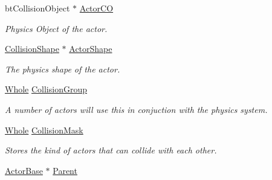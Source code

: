 \begin{DoxyCompactItemize}
\item 
\hypertarget{classphys_1_1ActorBasePhysicsSettings_a259d4d10541b28d389ffa287f07ec916}{
btCollisionObject $\ast$ \hyperlink{classphys_1_1ActorBasePhysicsSettings_a259d4d10541b28d389ffa287f07ec916}{ActorCO}}
\label{classphys_1_1ActorBasePhysicsSettings_a259d4d10541b28d389ffa287f07ec916}

\begin{DoxyCompactList}\small\item\em Physics Object of the actor. \item\end{DoxyCompactList}\item 
\hypertarget{classphys_1_1ActorBasePhysicsSettings_ac95d58db5957ab4f160a8cb5cc6c2f1b}{
\hyperlink{classphys_1_1CollisionShape}{CollisionShape} $\ast$ \hyperlink{classphys_1_1ActorBasePhysicsSettings_ac95d58db5957ab4f160a8cb5cc6c2f1b}{ActorShape}}
\label{classphys_1_1ActorBasePhysicsSettings_ac95d58db5957ab4f160a8cb5cc6c2f1b}

\begin{DoxyCompactList}\small\item\em The physics shape of the actor. \item\end{DoxyCompactList}\item 
\hypertarget{classphys_1_1ActorBasePhysicsSettings_a6a95b9dceba9a60f87b2ae0f3109b638}{
\hyperlink{namespacephys_a460f6bc24c8dd347b05e0366ae34f34a}{Whole} \hyperlink{classphys_1_1ActorBasePhysicsSettings_a6a95b9dceba9a60f87b2ae0f3109b638}{CollisionGroup}}
\label{classphys_1_1ActorBasePhysicsSettings_a6a95b9dceba9a60f87b2ae0f3109b638}

\begin{DoxyCompactList}\small\item\em A number of actors will use this in conjuction with the physics system. \item\end{DoxyCompactList}\item 
\hypertarget{classphys_1_1ActorBasePhysicsSettings_ae5f0c41d16868bf67e834b643207521f}{
\hyperlink{namespacephys_a460f6bc24c8dd347b05e0366ae34f34a}{Whole} \hyperlink{classphys_1_1ActorBasePhysicsSettings_ae5f0c41d16868bf67e834b643207521f}{CollisionMask}}
\label{classphys_1_1ActorBasePhysicsSettings_ae5f0c41d16868bf67e834b643207521f}

\begin{DoxyCompactList}\small\item\em Stores the kind of actors that can collide with each other. \item\end{DoxyCompactList}\item 
\hypertarget{classphys_1_1ActorBasePhysicsSettings_a2bd46cc0b9e675c409d5e09772126030}{
\hyperlink{classphys_1_1ActorBase}{ActorBase} $\ast$ \hyperlink{classphys_1_1ActorBasePhysicsSettings_a2bd46cc0b9e675c409d5e09772126030}{Parent}}
\label{classphys_1_1ActorBasePhysicsSettings_a2bd46cc0b9e675c409d5e09772126030}


\end{DoxyCompactItemize}
